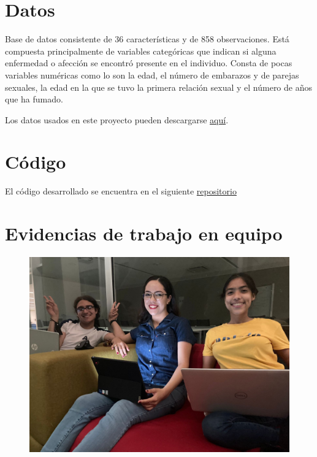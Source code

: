 \documentclass[journal]{IEEEtran}
\begin{document}
    \appendices
    
    \section{Datos} \label{data}

        Base de datos consistente de 36 características y de 858 observaciones. Está compuesta principalmente de variables categóricas que indican si alguna enfermedad o afección se encontró presente en el individuo. Consta de pocas variables numéricas como lo son la edad, el número de embarazos y de parejas sexuales, la edad en la que se tuvo la primera relación sexual y el número de años que ha fumado.

        Los datos usados en este proyecto pueden descargarse \href{https://www.kaggle.com/code/ravaliraj/risk-classification-of-cervical-cancer}{aquí}.

    \section{Código} \label{code}

        El código desarrollado se encuentra en el siguiente \href{https://github.com/JuanEcheagaray75/cancer-clf}{repositorio}

    \section{Evidencias de trabajo en equipo}
    \begin{figure}[!ht]
        \centering
        \includegraphics[scale=0.1]{img/team.jpg}
    \end{figure}


    
    
\end{document}
